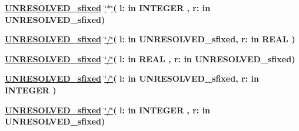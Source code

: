\begin{DoxyCompactItemize}
\item 
{\bfseries {\bfseries {\bfseries \hyperlink{classfixed__pkg_aa723b28a027c3c0f9bca02d75e8df4d6}{U\+N\+R\+E\+S\+O\+L\+V\+E\+D\+\_\+sfixed}} \textcolor{vhdlchar}{ }}} \hyperlink{classfixed__pkg_adc75e260eb741edc3aae92fed900c09a}{\char`\"{}$\ast$\char`\"{}}{\bfseries  ( }{\bfseries \textcolor{vhdlchar}{l\+: }\textcolor{stringliteral}{in }{\bfseries \textcolor{comment}{I\+N\+T\+E\+G\+E\+R}\textcolor{vhdlchar}{ }}}{\bfseries  , \textcolor{vhdlchar}{r\+: }\textcolor{stringliteral}{in }\textcolor{vhdlchar}{U\+N\+R\+E\+S\+O\+L\+V\+E\+D\+\_\+sfixed}}{\bfseries  )} 
\item 
{\bfseries {\bfseries {\bfseries \hyperlink{classfixed__pkg_aa723b28a027c3c0f9bca02d75e8df4d6}{U\+N\+R\+E\+S\+O\+L\+V\+E\+D\+\_\+sfixed}} \textcolor{vhdlchar}{ }}} \hyperlink{classfixed__pkg_af45777f020bdfeb4078a948c1a3856c3}{\char`\"{}/\char`\"{}}{\bfseries  ( }{\bfseries \textcolor{vhdlchar}{l\+: }\textcolor{stringliteral}{in }\textcolor{vhdlchar}{U\+N\+R\+E\+S\+O\+L\+V\+E\+D\+\_\+sfixed}}{\bfseries  , \textcolor{vhdlchar}{r\+: }\textcolor{stringliteral}{in }{\bfseries \textcolor{comment}{R\+E\+A\+L}\textcolor{vhdlchar}{ }}}{\bfseries  )} 
\item 
{\bfseries {\bfseries {\bfseries \hyperlink{classfixed__pkg_aa723b28a027c3c0f9bca02d75e8df4d6}{U\+N\+R\+E\+S\+O\+L\+V\+E\+D\+\_\+sfixed}} \textcolor{vhdlchar}{ }}} \hyperlink{classfixed__pkg_af45777f020bdfeb4078a948c1a3856c3}{\char`\"{}/\char`\"{}}{\bfseries  ( }{\bfseries \textcolor{vhdlchar}{l\+: }\textcolor{stringliteral}{in }{\bfseries \textcolor{comment}{R\+E\+A\+L}\textcolor{vhdlchar}{ }}}{\bfseries  , \textcolor{vhdlchar}{r\+: }\textcolor{stringliteral}{in }\textcolor{vhdlchar}{U\+N\+R\+E\+S\+O\+L\+V\+E\+D\+\_\+sfixed}}{\bfseries  )} 
\item 
{\bfseries {\bfseries {\bfseries \hyperlink{classfixed__pkg_aa723b28a027c3c0f9bca02d75e8df4d6}{U\+N\+R\+E\+S\+O\+L\+V\+E\+D\+\_\+sfixed}} \textcolor{vhdlchar}{ }}} \hyperlink{classfixed__pkg_af45777f020bdfeb4078a948c1a3856c3}{\char`\"{}/\char`\"{}}{\bfseries  ( }{\bfseries \textcolor{vhdlchar}{l\+: }\textcolor{stringliteral}{in }\textcolor{vhdlchar}{U\+N\+R\+E\+S\+O\+L\+V\+E\+D\+\_\+sfixed}}{\bfseries  , \textcolor{vhdlchar}{r\+: }\textcolor{stringliteral}{in }{\bfseries \textcolor{comment}{I\+N\+T\+E\+G\+E\+R}\textcolor{vhdlchar}{ }}}{\bfseries  )} 
\item 
{\bfseries {\bfseries {\bfseries \hyperlink{classfixed__pkg_aa723b28a027c3c0f9bca02d75e8df4d6}{U\+N\+R\+E\+S\+O\+L\+V\+E\+D\+\_\+sfixed}} \textcolor{vhdlchar}{ }}} \hyperlink{classfixed__pkg_af45777f020bdfeb4078a948c1a3856c3}{\char`\"{}/\char`\"{}}{\bfseries  ( }{\bfseries \textcolor{vhdlchar}{l\+: }\textcolor{stringliteral}{in }{\bfseries \textcolor{comment}{I\+N\+T\+E\+G\+E\+R}\textcolor{vhdlchar}{ }}}{\bfseries  , \textcolor{vhdlchar}{r\+: }\textcolor{stringliteral}{in }\textcolor{vhdlchar}{U\+N\+R\+E\+S\+O\+L\+V\+E\+D\+\_\+sfixed}}{\bfseries  )} 

\end{DoxyCompactItemize}
